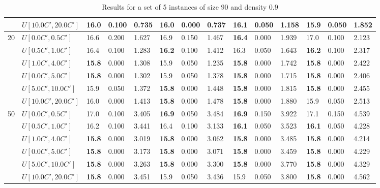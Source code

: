 \begin{table}[h]
{\begin{tabular}{|l|l||l|l|l||l|l|l||l|l|l||l|l|l|}
       & $U[10.0C',20.0C']$ & 16.0 & 0.100 & 0.735 & 16.0 & 0.000 & 0.737 & 16.1 & 0.050 & 1.158 & \textbf{15.9} & 0.050 & 1.852 \\
      \hline\hline
      \multirow{6}{*}{20} & $U[0.0C',0.5C']$ & 16.6 & 0.200 & 1.627 & 16.9 & 0.150 & 1.467 & \textbf{16.4} & 0.000 & 1.939 & 17.0 & 0.100 & 2.123 \\
       & $U[0.5C',1.0C']$ & 16.4 & 0.100 & 1.283 & \textbf{16.2} & 0.100 & 1.412 & 16.3 & 0.050 & 1.643 & \textbf{16.2} & 0.100 & 2.317 \\
       & $U[1.0C',4.0C']$ & \textbf{15.8} & 0.000 & 1.308 & 15.9 & 0.050 & 1.235 & \textbf{15.8} & 0.000 & 1.742 & \textbf{15.8} & 0.000 & 2.422 \\
       & $U[0.0C',5.0C']$ & \textbf{15.8} & 0.000 & 1.302 & 15.9 & 0.050 & 1.378 & \textbf{15.8} & 0.000 & 1.715 & \textbf{15.8} & 0.000 & 2.406 \\
       & $U[5.0C',10.0C']$ & 15.9 & 0.050 & 1.372 & \textbf{15.8} & 0.000 & 1.448 & \textbf{15.8} & 0.000 & 1.815 & \textbf{15.8} & 0.000 & 2.455 \\
       & $U[10.0C',20.0C']$ & 16.0 & 0.000 & 1.413 & \textbf{15.8} & 0.000 & 1.478 & \textbf{15.8} & 0.000 & 1.880 & 15.9 & 0.050 & 2.513 \\
      \hline\hline
      \multirow{6}{*}{50} & $U[0.0C',0.5C']$ & 17.0 & 0.100 & 3.405 & \textbf{16.9} & 0.050 & 3.484 & \textbf{16.9} & 0.150 & 3.922 & 17.1 & 0.150 & 4.539 \\
       & $U[0.5C',1.0C']$ & 16.2 & 0.100 & 3.441 & 16.4 & 0.100 & 3.133 & \textbf{16.1} & 0.050 & 3.523 & \textbf{16.1} & 0.050 & 4.228 \\
       & $U[1.0C',4.0C']$ & \textbf{15.8} & 0.000 & 3.019 & \textbf{15.8} & 0.000 & 3.062 & \textbf{15.8} & 0.000 & 3.485 & \textbf{15.8} & 0.000 & 4.214 \\
       & $U[0.0C',5.0C']$ & \textbf{15.8} & 0.000 & 3.173 & \textbf{15.8} & 0.000 & 3.071 & \textbf{15.8} & 0.000 & 3.459 & \textbf{15.8} & 0.000 & 4.229 \\
       & $U[5.0C',10.0C']$ & \textbf{15.8} & 0.000 & 3.263 & \textbf{15.8} & 0.000 & 3.300 & \textbf{15.8} & 0.000 & 3.770 & \textbf{15.8} & 0.000 & 4.329 \\
       & $U[10.0C',20.0C']$ & \textbf{15.8} & 0.000 & 3.451 & 15.9 & 0.050 & 3.436 & 15.9 & 0.050 & 3.800 & \textbf{15.8} & 0.000 & 4.562 \\
      \hline
      \end{tabular}
      }
      \caption{Results for a set of 5 instances of size $90$ and density $0.9$}
      \label{tab:pcpn90p9}\end{table}


